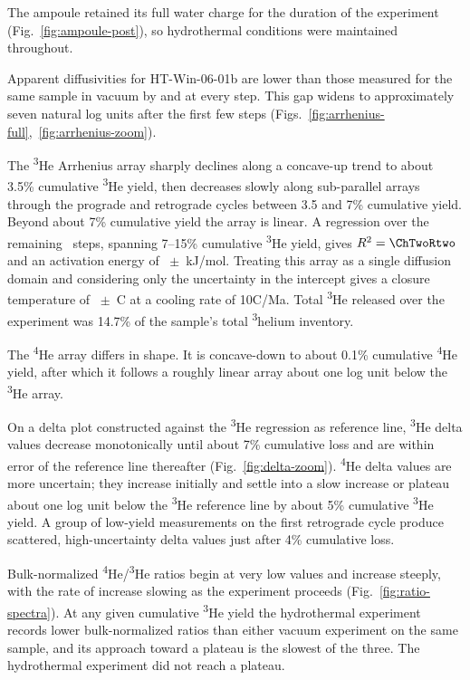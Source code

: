 The ampoule retained its full water charge for the duration of the experiment (Fig.~\ref{fig:ampoule-post}), so hydrothermal conditions were maintained throughout.

Apparent diffusivities for HT-Win-06-01b are lower than those measured for the same sample in vacuum by \citet{monteiro2017} and \citet{farley2024} at every step. This gap widens to approximately seven natural log units after the first few steps (Figs.~\ref{fig:arrhenius-full},~\ref{fig:arrhenius-zoom}).

The \textsuperscript{3}He Arrhenius array sharply declines along a concave-up trend to about 3.5\% cumulative \textsuperscript{3}He yield, then decreases slowly along sub-parallel arrays through the prograde and retrograde cycles between 3.5 and 7\% cumulative yield. Beyond about 7\% cumulative yield the array is linear. A regression over the remaining \ChTwoN\ steps, spanning 7--15\% cumulative \textsuperscript{3}He yield, gives $R^{2} = \ChTwoRtwo$ and an activation energy of \ChTwoEa\ $\pm$ \ChTwoEaErr\,kJ/mol. Treating this array as a single diffusion domain and considering only the uncertainty in the intercept gives a closure temperature of \ChTwoTc\ $\pm$ \ChTwoTcErr\,\textdegree C at a cooling rate of 10\textdegree C/Ma. Total \textsuperscript{3}He released over the experiment was 14.7\% of the sample's total \textsuperscript{3}helium inventory.

The \textsuperscript{4}He array differs in shape. It is concave-down to about 0.1\% cumulative \textsuperscript{4}He yield, after which it follows a roughly linear array about one log unit below the \textsuperscript{3}He array.

On a delta plot constructed against the \textsuperscript{3}He regression as reference line, \textsuperscript{3}He delta values decrease monotonically until about 7\% cumulative loss and are within error of the reference line thereafter (Fig.~\ref{fig:delta-zoom}). \textsuperscript{4}He delta values are more uncertain; they increase initially and settle into a slow increase or plateau about one log unit below the \textsuperscript{3}He reference line by about 5\% cumulative \textsuperscript{3}He yield. A group of low-yield measurements on the first retrograde cycle produce scattered, high-uncertainty delta values just after 4\% cumulative loss.

Bulk-normalized \textsuperscript{4}He/\textsuperscript{3}He ratios begin at very low values and increase steeply, with the rate of increase slowing as the experiment proceeds (Fig.~\ref{fig:ratio-spectra}). At any given cumulative \textsuperscript{3}He yield the hydrothermal experiment records lower bulk-normalized ratios than either vacuum experiment on the same sample, and its approach toward a plateau is the slowest of the three. The hydrothermal experiment did not reach a plateau. 

